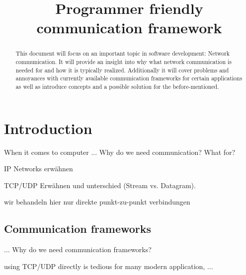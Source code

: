\documentclass[conference]{IEEEtran}
\begin{document}
\title{Programmer friendly communication framework}

\author{
    \and
}

\maketitle

\begin{abstract}
    This document will focus on an important topic in software development: Network communication. It will provide an insight into why what network communication is needed for and how it is typically realized. Additionally it will cover problems and annoyances with currently available communication frameworks for certain applications as well as introduce concepts and a possible solution for the before-mentioned. 
\end{abstract}

\section{Introduction}

When it comes to computer 
... Why do we need communication? What for?

IP Networks erwähnen 

TCP/UDP Erwähnen und unterschied (Stream vs. Datagram).

wir behandeln hier nur direkte punkt-zu-punkt verbindungen 

\subsection{Communication frameworks}

... Why do we need communication frameworks? 

using TCP/UDP directly is tedious for many modern application, ...
\end{document}
